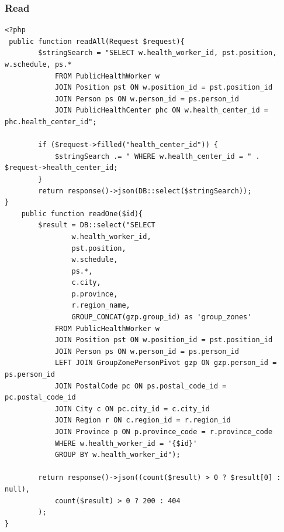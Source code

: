 \documentclass{article}
\begin{document}
\subsubsection{Read}
\begin{verbatim}
<?php
 public function readAll(Request $request){
        $stringSearch = "SELECT w.health_worker_id, pst.position, w.schedule, ps.*
            FROM PublicHealthWorker w
            JOIN Position pst ON w.position_id = pst.position_id
            JOIN Person ps ON w.person_id = ps.person_id
            JOIN PublicHealthCenter phc ON w.health_center_id = phc.health_center_id";

        if ($request->filled("health_center_id")) {
            $stringSearch .= " WHERE w.health_center_id = " . $request->health_center_id;
        }
        return response()->json(DB::select($stringSearch));
}
    public function readOne($id){
        $result = DB::select("SELECT
                w.health_worker_id,
                pst.position,
                w.schedule,
                ps.*,
                c.city,
                p.province,
                r.region_name,
                GROUP_CONCAT(gzp.group_id) as 'group_zones'
            FROM PublicHealthWorker w
            JOIN Position pst ON w.position_id = pst.position_id
            JOIN Person ps ON w.person_id = ps.person_id
            LEFT JOIN GroupZonePersonPivot gzp ON gzp.person_id = ps.person_id
            JOIN PostalCode pc ON ps.postal_code_id = pc.postal_code_id
            JOIN City c ON pc.city_id = c.city_id
            JOIN Region r ON c.region_id = r.region_id
            JOIN Province p ON p.province_code = r.province_code
            WHERE w.health_worker_id = '{$id}'
            GROUP BY w.health_worker_id");

        return response()->json((count($result) > 0 ? $result[0] : null),
            count($result) > 0 ? 200 : 404
        );
}

\end{verbatim}
\end{document}
